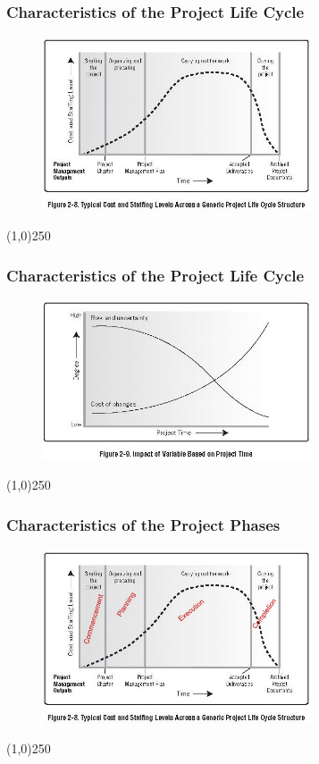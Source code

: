 \begin{frame}
\frametitle{Characteristics of the Project Life Cycle}
 \begin{figure}
 	\centering
 		\includegraphics[width = 8cm]{images/Fig2-8.jpg}
 	\label{fig:2-8}
 \end{figure}
\end{frame}
\begin{center}\line(1,0){250}\end{center}



\begin{frame}
\frametitle{Characteristics of the Project Life Cycle}
 \begin{figure}
 	\centering
 		\includegraphics[width = 8cm]{images/Fig2-9.jpg}
 	\label{fig:2-9}
 \end{figure}
\end{frame}
\begin{center}\line(1,0){250}\end{center}



\begin{frame}
\frametitle{Characteristics of the Project Phases}
 \begin{figure}
 	\centering
 		\includegraphics[width = 8cm]{images/Fig2-8edit.jpg}
 	\label{fig:2-8edit}
 \end{figure}
\end{frame}
\begin{center}\line(1,0){250}\end{center}



